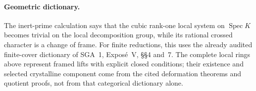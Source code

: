 \paragraph{Geometric dictionary.}
The inert-prime calculation says that the cubic rank-one
local system on $\operatorname{Spec}K$ becomes trivial on
the local decomposition group, while its rational crossed
character is a change of frame.  For finite reductions,
this uses the already audited finite-cover dictionary of
SGA~1, Expos\'e~V, \S\S4 and~7.  The complete local rings
above represent framed lifts with explicit closed conditions;
their existence and selected crystalline component come
from the cited deformation theorems and quotient proofs,
not from that categorical dictionary alone.
